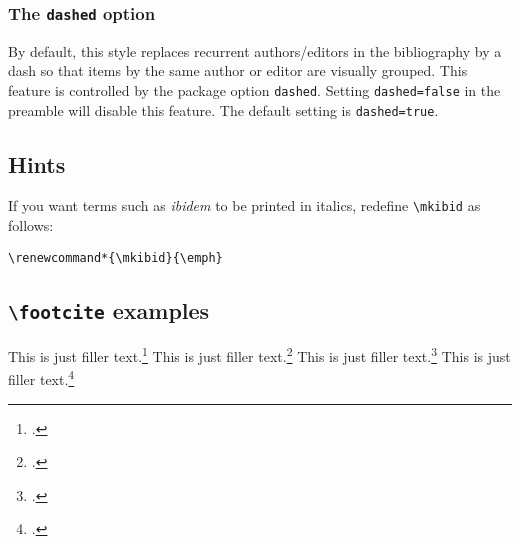 \documentclass[a4paper]{article}
\newcommand{\cmd}[1]{\texttt{\textbackslash #1}}
\begin{document}
\subsubsection*{The \texttt{dashed} option}

By default, this style replaces recurrent authors/editors in the
bibliography by a dash so that items by the same author or editor
are visually grouped. This feature is controlled by the package
option \texttt{dashed}. Setting \texttt{dashed=false} in the
preamble will disable this feature. The default setting is
\texttt{dashed=true}.

\subsection*{Hints}

If you want terms such as \emph{ibidem} to be printed in italics,
redefine \cmd{mkibid} as follows:

\begin{verbatim}
\renewcommand*{\mkibid}{\emph}
\end{verbatim}

\subsection*{\cmd{footcite} examples}

This is just filler text.\footcite{aristotle:rhetoric}
This is just filler text.\footcite{aristotle:rhetoric}
\clearpage
This is just filler text.\footcite[55]{aristotle:rhetoric}
This is just filler text.\footcite[55]{aristotle:rhetoric}

\clearpage
\printbibliography
\end{document}
